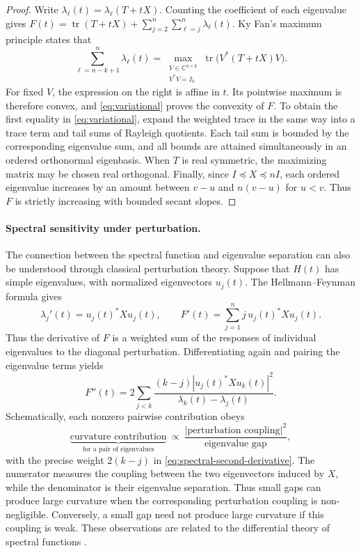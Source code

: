 \documentclass[10pt,a4paper]{article}
\DeclareMathOperator{\tr}{tr}
\newcommand{\C}{\mathbb C}
\begin{document}
\begin{proof}
Write $\lambda_\ell(t)=\lambda_\ell(T+tX)$. Counting the
coefficient of each eigenvalue gives
$
F(t)=\tr(T+tX)+\sum_{j=2}^n\sum_{\ell=j}^n\lambda_\ell(t).
$
Ky Fan's maximum principle \cite{Fan1949} states that
\[
\sum_{\ell=n-k+1}^n\lambda_\ell(t)
=\max_{\substack{V\in\C^{n\times k}\\V^*V=I_k}}
\tr\bigl(V^*(T+tX)V\bigr).
\]
For fixed $V$, the expression on the right is affine in $t$.
Its pointwise maximum is therefore convex, and \eqref{eq:variational}
proves the convexity of $F$. To obtain the first equality
in \eqref{eq:variational}, expand the weighted trace in the
same way into a trace term and tail sums of Rayleigh quotients.
Each tail sum is bounded by the corresponding eigenvalue sum,
and all bounds are attained simultaneously in an ordered
orthonormal eigenbasis. When $T$ is real symmetric, the
maximizing matrix may be chosen real orthogonal. 
Finally, since $I\preceq X\preceq nI$, each ordered eigenvalue
increases by an amount between $v-u$ and $n(v-u)$ for $u<v$.
Thus $F$ is strictly increasing with bounded secant slopes.
\end{proof}


\paragraph{Spectral sensitivity under perturbation.}

The connection between the spectral function and
eigenvalue separation can also be understood through
classical perturbation theory. Suppose that $H(t)$
has simple eigenvalues, with normalized eigenvectors
$u_j(t)$. The Hellmann--Feynman formula gives
\begin{equation}\label{eq:spectral-first-derivative}
\lambda_j'(t)=u_j(t)^*Xu_j(t),\qquad
F'(t)=\sum_{j=1}^n j\,u_j(t)^*Xu_j(t).
\end{equation}
Thus the derivative of $F$ is a weighted sum of the
responses of individual eigenvalues to the diagonal
perturbation. Differentiating again and pairing the
eigenvalue terms yields
\begin{equation}\label{eq:spectral-second-derivative}
\boxed{
F''(t)=2\sum_{j<k}
\frac{(k-j)|u_j(t)^*Xu_k(t)|^2}
{\lambda_k(t)-\lambda_j(t)}.
}
\end{equation}
Schematically, each nonzero pairwise contribution obeys
\[
\underbrace{\text{curvature contribution}}_{\text{for a pair of eigenvalues}}
\ \propto\
\frac{|\text{perturbation coupling}|^2}{\text{eigenvalue gap}},
\]
with the precise weight $2(k-j)$ in \eqref{eq:spectral-second-derivative}.
The numerator measures the coupling between the two
eigenvectors induced by $X$, while the denominator
is their eigenvalue separation. Thus small gaps can
produce large curvature when the corresponding
perturbation coupling is non-negligible. Conversely,
a small gap need not produce large curvature if this
coupling is weak. These observations are related to
the differential theory of spectral functions
\cite{Lewis1996Derivatives,LewisSendov2001,
DrusvyatskiyPaquette2018}.
\end{document}
